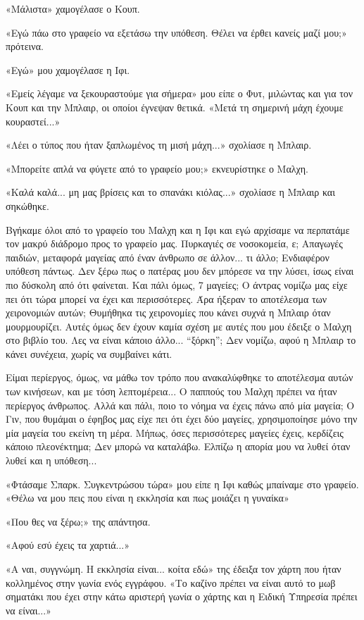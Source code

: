 \documentclass[12pt,twoside, openany]{book}
\begin{document}
«Μάλιστα» χαμογέλασε ο Κουπ.

«Εγώ πάω στο γραφείο να εξετάσω την υπόθεση. Θέλει να έρθει κανείς μαζί μου;» πρότεινα.

«Εγώ» μου χαμογέλασε η Ιφι.

«Εμείς λέγαμε να ξεκουραστούμε για σήμερα» μου είπε ο Φυτ, μιλώντας και για τον Κουπ και την Μπλαιρ, οι οποίοι έγνεψαν θετικά. «Μετά τη σημερινή μάχη έχουμε κουραστεί...»

«Λέει ο τύπος που ήταν ξαπλωμένος τη μισή μάχη...» σχολίασε η Μπλαιρ.

«Μπορείτε απλά να φύγετε από το γραφείο μου;» εκνευρίστηκε ο Μαλχη.

«Καλά καλά... μη μας βρίσεις και το σπανάκι κιόλας...» σχολίασε η Μπλαιρ και σηκώθηκε.

Βγήκαμε όλοι από το γραφείο του Μαλχη και η Ιφι και εγώ αρχίσαμε να περπατάμε τον μακρύ διάδρομο προς το γραφείο μας. Πυρκαγιές σε νοσοκομεία, ε; Απαγωγές παιδιών, μεταφορά μαγείας από έναν άνθρωπο σε άλλον... τι άλλο; Ενδιαφέρον υπόθεση πάντως. Δεν ξέρω πως ο πατέρας μου δεν μπόρεσε να την λύσει, ίσως είναι πιο δύσκολη από ότι φαίνεται. Και πάλι όμως, 7 μαγείες; Ο άντρας νομίζω μας είχε πει ότι τώρα μπορεί να έχει και περισσότερες. Άρα ήξεραν το αποτέλεσμα των χειρονομιών αυτών; Θυμήθηκα τις χειρονομίες που κάνει συχνά η Μπλαιρ όταν μουρμουρίζει. Αυτές όμως δεν έχουν καμία σχέση με αυτές που μου έδειξε ο Μαλχη στο βιβλίο του. Λες να είναι κάποιο άλλο... “ξόρκη”; Δεν νομίζω, αφού η Μπλαιρ το κάνει συνέχεια, χωρίς να συμβαίνει κάτι.

Είμαι περίεργος, όμως, να μάθω τον τρόπο που ανακαλύφθηκε το αποτέλεσμα αυτών των κινήσεων, και με τόση λεπτομέρεια... Ο παππούς του Μαλχη πρέπει να ήταν περίεργος άνθρωπος. Αλλά και πάλι, ποιο το νόημα να έχεις πάνω από μία μαγεία; Ο Γιν, που θυμάμαι ο έφηβος μας είχε πει ότι έχει δύο μαγείες, χρησιμοποίησε μόνο την μία μαγεία του εκείνη τη μέρα. Μήπως, όσες περισσότερες μαγείες έχεις, κερδίζεις κάποιο πλεονέκτημα; Δεν μπορώ να καταλάβω. Ελπίζω η απορία μου να λυθεί όταν λυθεί και η υπόθεση...

«Φτάσαμε Σπαρκ. Συγκεντρώσου τώρα» μου είπε η Ιφι καθώς μπαίναμε στο γραφείο. «Θέλω να μου πεις που είναι η εκκλησία και πως μοιάζει η γυναίκα»

«Που θες να ξέρω;» της απάντησα.

«Αφού εσύ έχεις τα χαρτιά...»

«Α ναι, συγγνώμη. Η εκκλησία είναι... κοίτα εδώ» της έδειξα τον χάρτη που ήταν κολλημένος στην γωνία ενός εγγράφου. «Το καζίνο πρέπει να είναι αυτό το μωβ σηματάκι που έχει στην κάτω αριστερή γωνία ο χάρτης και η Ειδική Υπηρεσία πρέπει να είναι...»
\end{document}
